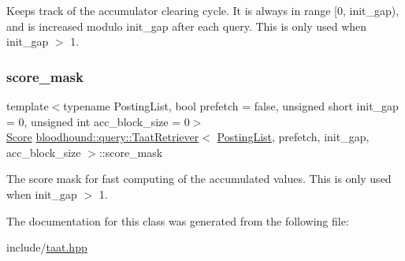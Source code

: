 Keeps track of the accumulator clearing cycle. It is always in range \mbox{[}0, init\+\_\+gap), and is increased modulo init\+\_\+gap after each query. This is only used when init\+\_\+gap $>$ 1. \mbox{\label{classbloodhound_1_1query_1_1TaatRetriever_ac38b873ceff34b55bb8ac82800946825}} 
\subsubsection{\texorpdfstring{score\+\_\+mask}{score\_mask}}
{\footnotesize\ttfamily template$<$typename Posting\+List, bool prefetch = false, unsigned short init\+\_\+gap = 0, unsigned int acc\+\_\+block\+\_\+size = 0$>$ \\
\hyperlink{structbloodhound_1_1Score}{Score} \hyperlink{classbloodhound_1_1query_1_1TaatRetriever}{bloodhound\+::query\+::\+Taat\+Retriever}$<$ \hyperlink{classbloodhound_1_1PostingList}{Posting\+List}, prefetch, init\+\_\+gap, acc\+\_\+block\+\_\+size $>$\+::score\+\_\+mask\hspace{0.3cm}{\ttfamily [protected]}}

The score mask for fast computing of the accumulated values. This is only used when init\+\_\+gap $>$ 1. 

The documentation for this class was generated from the following file\+:\begin{DoxyCompactItemize}
\item 
include/\hyperlink{taat_8hpp}{taat.\+hpp}\end{DoxyCompactItemize}
